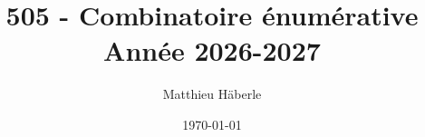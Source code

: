 \documentclass[a4paper, 12pt]{report}
\title{
	{\Huge 505 - Combinatoire énumérative \\ }
	{\huge Année 2026-2027}
}
\author{\Large{Matthieu Häberle}}
\date{\today}
\begin{document}
\maketitle
\newpage
\twocolstableofcontents
\pagebreak






\end{document}
